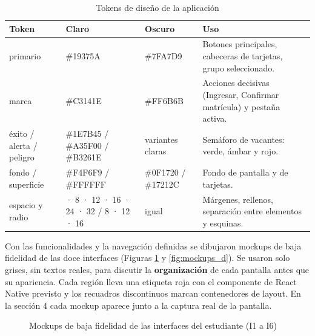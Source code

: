 \begin{table}[H]
\centering\small
\caption{Tokens de diseño de la aplicación}\label{tab:tokens}
\renewcommand{\arraystretch}{1.25}
\begin{tabular}{|>{\raggedright\arraybackslash}p{}|>{\raggedright\arraybackslash}p{}|>{\raggedright\arraybackslash}p{}|>{\raggedright\arraybackslash}p{}|}
\hline
\rowcolor{colabpyblue} \color{white}\textbf{Token} & \color{white}\textbf{Claro} & \color{white}\textbf{Oscuro} & \color{white}\textbf{Uso} \\ \hline
primario & \#19375A & \#7FA7D9 & Botones principales, cabeceras de tarjetas, grupo seleccionado. \\ \hline
\rowcolor{colabpybg} marca & \#C3141E & \#FF6B6B & Acciones decisivas (Ingresar, Confirmar matrícula) y pestaña activa. \\ \hline
éxito / alerta / peligro & \#1E7B45 / \#A35F00 / \#B3261E & variantes claras & Semáforo de vacantes: verde, ámbar y rojo. \\ \hline
\rowcolor{colabpybg} fondo / superficie & \#F4F6F9 / \#FFFFFF & \#0F1720 / \#17212C & Fondo de pantalla y de tarjetas. \\ \hline
espacio y radio & 4 · 8 · 12 · 16 · 24 · 32 / 8 · 12 · 16 & igual & Márgenes, rellenos, separación entre elementos y esquinas. \\ \hline
\end{tabular}
\end{table}

\vspace{0.2cm}

Con las funcionalidades y la navegación definidas se dibujaron mockups de baja fidelidad de las doce interfaces (Figuras \ref{fig:mockups_e} y \ref{fig:mockups_d}). Se usaron solo grises, sin textos reales, para discutir la \textbf{organización} de cada pantalla antes que su apariencia. Cada región lleva una etiqueta roja con el componente de React Native previsto y los recuadros discontinuos marcan contenedores de layout. En la sección 4 cada mockup aparece junto a la captura real de la pantalla.

\begin{figure}[!htbp]
\centering
{}
\caption{Mockups de baja fidelidad de las interfaces del estudiante (I1 a I6)}
\label{fig:mockups_e}
\end{figure}

